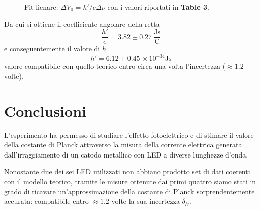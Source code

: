 \documentclass[9pt,a4paper,twocolumn,twoside]{tau-class/tau}
\begin{document}
\begin{figure}[H]
\centering
\caption{Fit lienare: \(\Delta V_0 = h'/e \Delta \nu\) con i valori riportati in \textbf{Table 3}.}
\end{figure}
Da cui si ottiene il coefficiente angolare della retta
\[
\frac{h'}{e} = 3.82 \pm 0.27 \: \frac{\text{Js}}{\text{C}}
\]
e conseguentemente il valore di \(h\)
\[
\boxed{h' = 6.12 \pm 0.45 \, \times 10^{-34} \text{Js}}
\]
valore compatibile con quello teorico entro circa una volta l'incertezza (\( \approx 1.2\) volte).

\section{Conclusioni}
L'esperimento ha permesso di studiare l'effetto fotoelettrico e di stimare il valore della costante di Planck attraverso la misura della corrente elettrica generata dall'irraggiamento di un catodo metallico con LED a diverse lunghezze d'onda.

Nonostante due dei sei LED utilizzati non abbiano prodotto set di dati coerenti con il modello teorico, tramite le misure ottenute dai primi quattro siamo stati in grado di ricavare un'approssimazione della costante di Planck sorprendentemente accurata: compatibile entro \(\approx 1.2\) volte la sua incertezza \(\delta_{h'}\).
\end{document}
